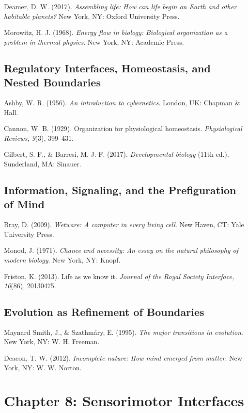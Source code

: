 \documentclass[
  openright]{book}
\begin{document}
Deamer, D. W. (2017). \emph{Assembling life: How can life begin on Earth
and other habitable planets?} New York, NY: Oxford University Press.

Morowitz, H. J. (1968). \emph{Energy flow in biology: Biological
organization as a problem in thermal physics}. New York, NY: Academic
Press.

\subsection{Regulatory Interfaces, Homeostasis, and Nested
Boundaries}\label{regulatory-interfaces-homeostasis-and-nested-boundaries}

Ashby, W. R. (1956). \emph{An introduction to cybernetics}. London, UK:
Chapman \& Hall.

Cannon, W. B. (1929). Organization for physiological homeostasis.
\emph{Physiological Reviews, 9}(3), 399--431.

Gilbert, S. F., \& Barresi, M. J. F. (2017). \emph{Developmental
biology} (11th ed.). Sunderland, MA: Sinauer.

\subsection{Information, Signaling, and the Prefiguration of
Mind}\label{information-signaling-and-the-prefiguration-of-mind}

Bray, D. (2009). \emph{Wetware: A computer in every living cell}. New
Haven, CT: Yale University Press.

Monod, J. (1971). \emph{Chance and necessity: An essay on the natural
philosophy of modern biology}. New York, NY: Knopf.

Friston, K. (2013). Life as we know it. \emph{Journal of the Royal
Society Interface, 10}(86), 20130475.

\subsection{Evolution as Refinement of
Boundaries}\label{evolution-as-refinement-of-boundaries-1}

Maynard Smith, J., \& Szathmáry, E. (1995). \emph{The major transitions
in evolution}. New York, NY: W. H. Freeman.

Deacon, T. W. (2012). \emph{Incomplete nature: How mind emerged from
matter}. New York, NY: W. W. Norton.

\section{Chapter 8: Sensorimotor
Interfaces}\label{chapter-8-sensorimotor-interfaces}
\end{document}
